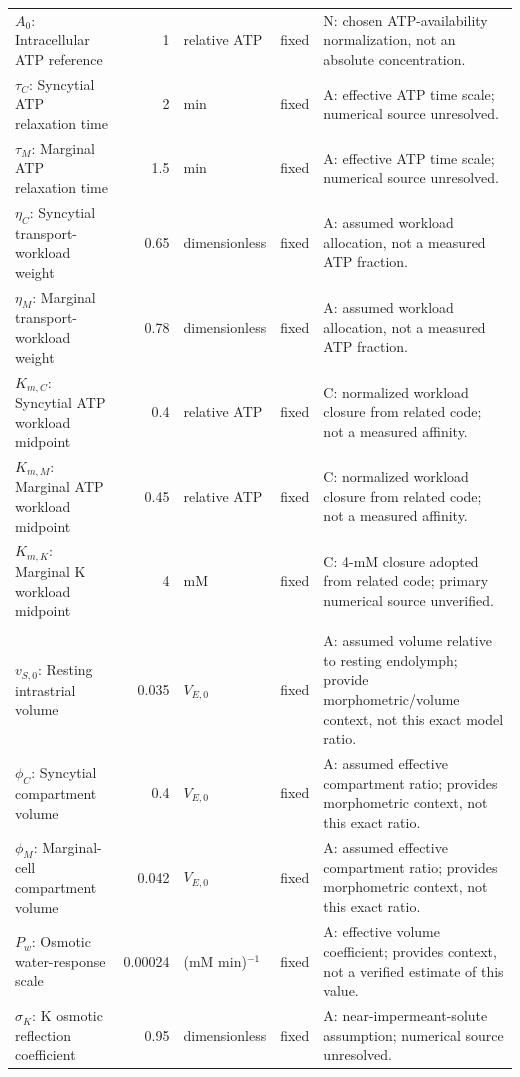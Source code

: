 \begin{longtable}{@{}>{\raggedright\arraybackslash}p{4.4cm}r>{\raggedright\arraybackslash}p{2.0cm}>{\raggedright\arraybackslash}p{1.0cm}>{\raggedright\arraybackslash}p{8.0cm}@{}}
\(A_0\): Intracellular ATP reference & 1 & relative ATP & fixed & N: chosen ATP-availability normalization, not an absolute concentration. \\
\(\tau_C\): Syncytial ATP relaxation time & 2 & min & fixed & A: effective ATP time scale; numerical source unresolved. \\
\(\tau_M\): Marginal ATP relaxation time & 1.5 & min & fixed & A: effective ATP time scale; numerical source unresolved. \\
\(\eta_C\): Syncytial transport-workload weight & 0.65 & dimensionless & fixed & A: assumed workload allocation, not a measured ATP fraction. \\
\(\eta_M\): Marginal transport-workload weight & 0.78 & dimensionless & fixed & A: assumed workload allocation, not a measured ATP fraction. \\
\(K_{m,C}\): Syncytial ATP workload midpoint & 0.4 & relative ATP & fixed & C: normalized workload closure from related code; not a measured affinity. \\
\(K_{m,M}\): Marginal ATP workload midpoint & 0.45 & relative ATP & fixed & C: normalized workload closure from related code; not a measured affinity. \\
\(K_{m,K}\): Marginal K workload midpoint & 4 & mM & fixed & C: 4-mM closure adopted from related code; primary numerical source unverified. \\
\addlinespace[4pt]\multicolumn{5}{@{}l}{\textbf{Volume and potassium transport}}\\*
\(v_{S,0}\): Resting intrastrial volume & 0.035 & \(V_{E,0}\) & fixed & A: assumed volume relative to resting endolymph; \citet{SantiDuvall1979,Salt2001} provide morphometric/volume context, not this exact model ratio. \\
\(\phi_C\): Syncytial compartment volume & 0.4 & \(V_{E,0}\) & fixed & A: assumed effective compartment ratio; \citet{SantiDuvall1979} provides morphometric context, not this exact ratio. \\
\(\phi_M\): Marginal-cell compartment volume & 0.042 & \(V_{E,0}\) & fixed & A: assumed effective compartment ratio; \citet{SantiDuvall1979} provides morphometric context, not this exact ratio. \\
\(P_w\): Osmotic water-response scale & 0.00024 & (mM min)\(^{-1}\) & fixed & A: effective volume coefficient; \citet{PikeBosher1980} provides context, not a verified estimate of this value. \\
\(\sigma_K\): K osmotic reflection coefficient & 0.95 & dimensionless & fixed & A: near-impermeant-solute assumption; numerical source unresolved. \\

\end{longtable}

